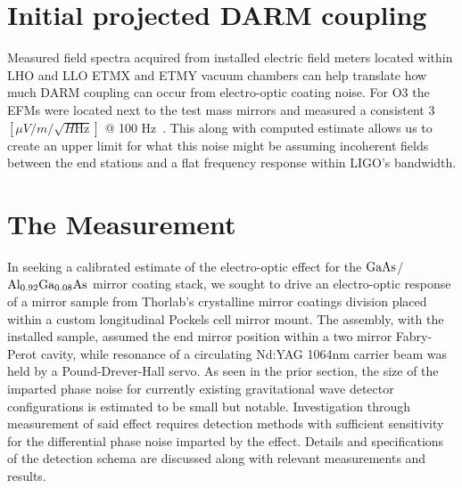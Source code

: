 \section{Initial projected DARM coupling}
Measured field spectra acquired from installed electric field meters located within LHO and LLO ETMX and ETMY vacuum chambers can help translate how much DARM coupling can occur from electro-optic coating noise. For O3 the EFMs were located next to the test mass mirrors and measured a consistent 3 $[\mu V / m / \sqrt{H\mathrm{Hz}}]$ @ 100 Hz~\cite{buikema:2020}. This along with computed estimate allows us to create an upper limit for what this noise might be assuming incoherent fields between the end stations and a flat frequency response within LIGO's bandwidth.


\section{The Measurement}
In seeking a calibrated estimate of the electro-optic effect for the $\mathrm{GaAs}$/$\mathrm{Al_{0.92}Ga_{0.08}As}$ mirror coating stack, we sought to drive an electro-optic response of a mirror sample from Thorlab's crystalline mirror coatings division placed within a custom longitudinal Pockels cell mirror mount. The assembly, with the installed sample, assumed the end mirror position within a two mirror Fabry-Perot cavity, while resonance of a circulating Nd:YAG 1064nm carrier beam was held by a Pound-Drever-Hall servo. As seen in the prior section, the size of the imparted phase noise for currently existing gravitational wave detector configurations is estimated to be small but notable. Investigation through measurement of said effect requires detection methods with sufficient sensitivity for the differential phase noise imparted by the effect. Details and specifications of the detection schema are discussed along with relevant measurements and results. 

